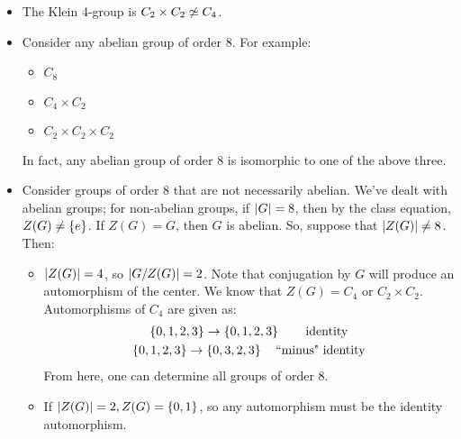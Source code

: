 \begin{xmp}[source=Primary Source Material]
    \begin{itemize}
        \item The Klein 4-group is $ C_{2} \times C_{2} \cnot\simeq C_{4} $.
        \item Consider any abelian group of order $ 8 $. For example:
            \begin{itemize}
                \item $ C_{8} $
                \item $ C_{4} \times C_{2} $
                \item $ C_{2} \times C_{2} \times C_{2} $
            \end{itemize}
            In fact, any abelian group of order $ 8 $ is isomorphic to one of the above three.
        \item Consider groups of order $ 8 $ that are not necessarily abelian.
            We've dealt with abelian groups; for non-abelian groups, if $ \abs{G} = 8 $, then
            by the class equation, $ Z(G) \neq \left\{{e}\right\} $. \vsp
            If $ Z(G) = G $, then $ G $ is abelian. So, suppose that $ \abs{Z(G)} \neq 8 $.
            Then:
            \begin{itemize}
                \item $ \abs{Z(G)} = 4 $, so $ \abs{G/Z(G)} = 2 $.
                    Note that conjugation by $ G $ will produce an automorphism of the center.
                    We know that $ Z(G) = C_{4} $ or $ C_{2} \times C_{2} $.
                    Automorphisms of $ C_{4} $ are given as:
                    \begin{gather*}
                        \left\{{0, 1, 2, 3}\right\} \rightarrow \left\{{0, 1, 2, 3}\right\} \qquad \textrm{identity} \\
                        \left\{{0, 1, 2, 3}\right\} \rightarrow \left\{{0, 3, 2, 3}\right\} \quad
                        \textrm{``minus" identity}
                    \end{gather*}
                    From here, one can determine all groups of order $ 8 $.
                \item If $ \abs{Z(G)} = 2, Z(G) = \left\{{0, 1}\right\} $, so any automorphism must be
                    the identity automorphism.
            \end{itemize}
    \end{itemize}
\end{xmp}

